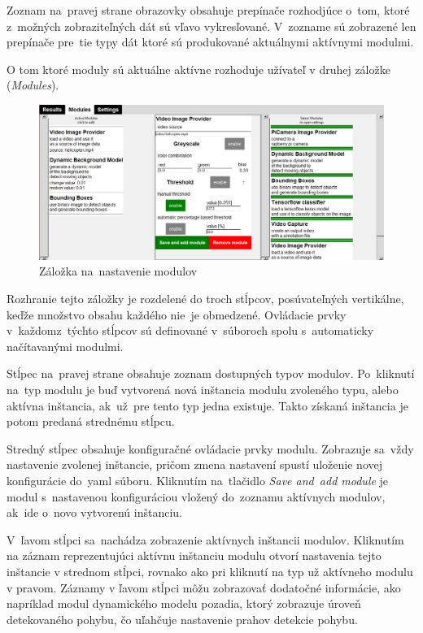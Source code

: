         Zoznam na~pravej strane obrazovky obsahuje prepínače rozhodjúce o~tom, ktoré z~možných  zobraziteľných dát sú vľavo vykresľované. V~zozname sú zobrazené len prepínače pre~tie typy dát ktoré sú produkované aktuálnymi aktívnymi modulmi.

        O tom ktoré moduly sú aktuálne aktívne rozhoduje užívateľ v druhej záložke (\emph{Modules}). 

        \begin{figure}[H]
            \centering
            \includegraphics[width=\textwidth]{obrazky/new_app/modules_window_motion_detection.png}
            \caption{Záložka na~nastavenie modulov}
        \end{figure}

        Rozhranie tejto záložky je rozdelené do troch stĺpcov, posúvateľných vertikálne, keďže množstvo obsahu každého nie~je obmedzené. Ovládacie prvky v~každom\linebreak z~týchto stĺpcov sú definované v~súboroch spolu s~automaticky načítavanými modulmi.

        Stĺpec na~pravej strane obsahuje zoznam dostupných typov modulov. Po~kliknutí na~typ modulu je buď vytvorená nová inštancia modulu zvoleného typu, alebo aktívna inštancia, ak~už~pre tento typ jedna existuje. Takto získaná inštancia je potom predaná strednému stĺpcu.

        Stredný stĺpec obsahuje konfiguračné ovládacie prvky modulu. Zobrazuje sa~vždy nastavenie zvolenej inštancie, pričom zmena nastavení spustí uloženie novej konfigurácie do~yaml súboru. Kliknutím na~tlačidlo \emph{Save and~add module} je modul s~nastavenou konfiguráciou vložený do~zoznamu aktívnych modulov, ak~ide o~novo vytvorenú inštanciu.
        
        V~ľavom stĺpci sa~nachádza zobrazenie aktívnych inštancii modulov. Kliknutím na záznam reprezentujúci aktívnu inštanciu modulu otvorí nastavenia tejto inštancie v strednom stĺpci, rovnako ako pri kliknutí na typ už aktívneho modulu v pravom. Záznamy v ľavom stĺpci môžu zobrazovať dodatočné informácie, ako napríklad modul dynamického modelu pozadia, ktorý zobrazuje úroveň detekovaného pohybu, čo uľahčuje nastavenie prahov detekcie pohybu.

